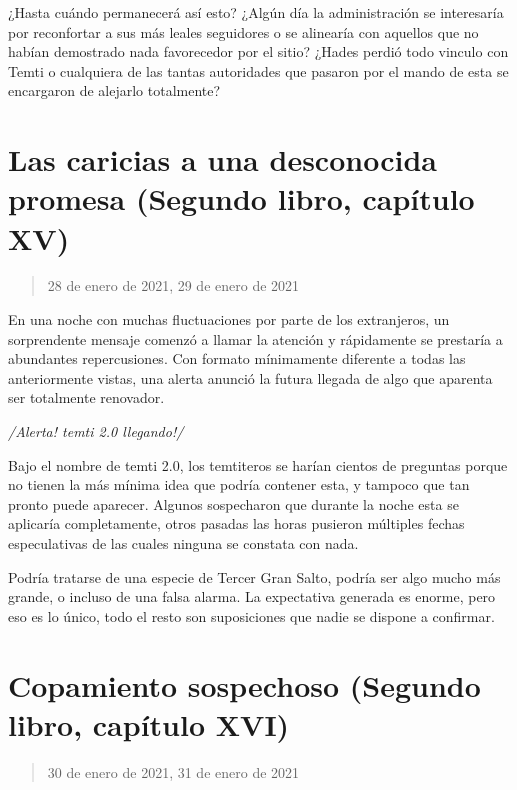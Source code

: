 \documentclass[
  spanish,
]{book}
\begin{document}
¿Hasta cuándo permanecerá así esto? ¿Algún día la administración se interesaría por reconfortar a sus más leales seguidores o se alinearía con aquellos que no habían demostrado nada favorecedor por el sitio? ¿Hades perdió todo vinculo con Temti o cualquiera de las tantas autoridades que pasaron por el mando de esta se encargaron de alejarlo totalmente?

\hypertarget{las-caricias-a-una-desconocida-promesa-segundo-libro-capuxedtulo-xv}{%
\section{Las caricias a una desconocida promesa (Segundo libro, capítulo XV)}\label{las-caricias-a-una-desconocida-promesa-segundo-libro-capuxedtulo-xv}}

\begin{quote}
28 de enero de 2021, 29 de enero de 2021
\end{quote}

En una noche con muchas fluctuaciones por parte de los extranjeros, un sorprendente mensaje comenzó a llamar la atención y rápidamente se prestaría a abundantes repercusiones. Con formato mínimamente diferente a todas las anteriormente vistas, una alerta anunció la futura llegada de algo que aparenta ser totalmente renovador.

\emph{/Alerta! temti 2.0 llegando!/}

Bajo el nombre de temti 2.0, los temtiteros se harían cientos de preguntas porque no tienen la más mínima idea que podría contener esta, y tampoco que tan pronto puede aparecer. Algunos sospecharon que durante la noche esta se aplicaría completamente, otros pasadas las horas pusieron múltiples fechas especulativas de las cuales ninguna se constata con nada.

Podría tratarse de una especie de Tercer Gran Salto, podría ser algo mucho más grande, o incluso de una falsa alarma. La expectativa generada es enorme, pero eso es lo único, todo el resto son suposiciones que nadie se dispone a confirmar.

\hypertarget{copamiento-sospechoso-segundo-libro-capuxedtulo-xvi}{%
\section{Copamiento sospechoso (Segundo libro, capítulo XVI)}\label{copamiento-sospechoso-segundo-libro-capuxedtulo-xvi}}

\begin{quote}
30 de enero de 2021, 31 de enero de 2021
\end{quote}
\end{document}
